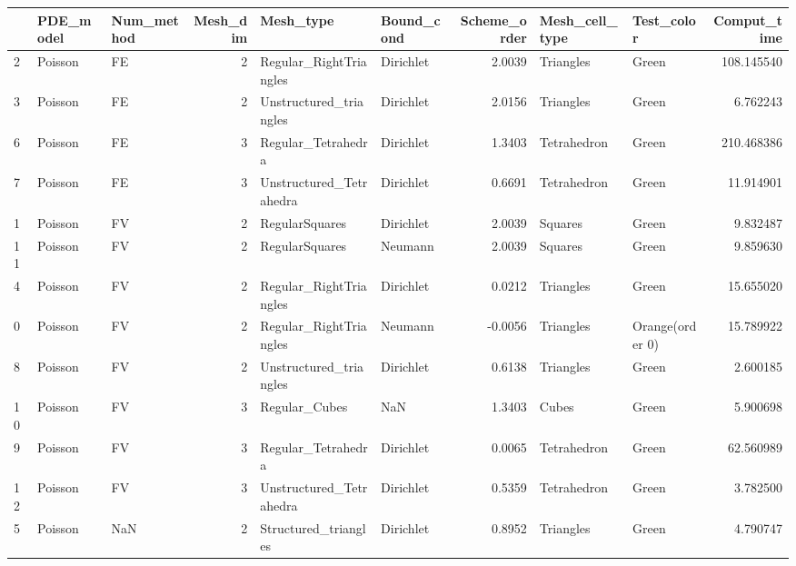 \begin{tabular}{lllrllrllr}
\toprule
{} & PDE\_model & Num\_method &  Mesh\_dim &                Mesh\_type & Bound\_cond &  Scheme\_order & Mesh\_cell\_type &       Test\_color &  Comput\_time \\
\midrule
2  &   Poisson &         FE &         2 &   Regular\_RightTriangles &  Dirichlet &        2.0039 &      Triangles &            Green &   108.145540 \\
3  &   Poisson &         FE &         2 &   Unstructured\_triangles &  Dirichlet &        2.0156 &      Triangles &            Green &     6.762243 \\
6  &   Poisson &         FE &         3 &       Regular\_Tetrahedra &  Dirichlet &        1.3403 &    Tetrahedron &            Green &   210.468386 \\
7  &   Poisson &         FE &         3 &  Unstructured\_Tetrahedra &  Dirichlet &        0.6691 &    Tetrahedron &            Green &    11.914901 \\
1  &   Poisson &         FV &         2 &           RegularSquares &  Dirichlet &        2.0039 &        Squares &            Green &     9.832487 \\
11 &   Poisson &         FV &         2 &           RegularSquares &    Neumann &        2.0039 &        Squares &            Green &     9.859630 \\
4  &   Poisson &         FV &         2 &   Regular\_RightTriangles &  Dirichlet &        0.0212 &      Triangles &            Green &    15.655020 \\
0  &   Poisson &         FV &         2 &   Regular\_RightTriangles &    Neumann &       -0.0056 &      Triangles &  Orange(order 0) &    15.789922 \\
8  &   Poisson &         FV &         2 &   Unstructured\_triangles &  Dirichlet &        0.6138 &      Triangles &            Green &     2.600185 \\
10 &   Poisson &         FV &         3 &            Regular\_Cubes &        NaN &        1.3403 &          Cubes &            Green &     5.900698 \\
9  &   Poisson &         FV &         3 &       Regular\_Tetrahedra &  Dirichlet &        0.0065 &    Tetrahedron &            Green &    62.560989 \\
12 &   Poisson &         FV &         3 &  Unstructured\_Tetrahedra &  Dirichlet &        0.5359 &    Tetrahedron &            Green &     3.782500 \\
5  &   Poisson &        NaN &         2 &     Structured\_triangles &  Dirichlet &        0.8952 &      Triangles &            Green &     4.790747 \\
\bottomrule
\end{tabular}
